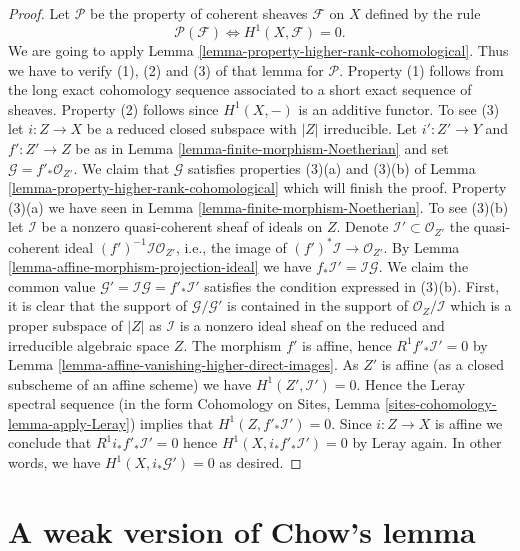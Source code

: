 \begin{proof}
\medskip\noindent
Let $\mathcal{P}$ be the property of coherent sheaves
$\mathcal{F}$ on $X$ defined by the rule
$$
\mathcal{P}(\mathcal{F}) \Leftrightarrow H^1(X, \mathcal{F}) = 0.
$$
We are going to apply Lemma \ref{lemma-property-higher-rank-cohomological}.
Thus we have to verify (1), (2) and (3) of that lemma for $\mathcal{P}$.
Property (1) follows from the long exact cohomology sequence associated
to a short exact sequence of sheaves. Property (2) follows since
$H^1(X, -)$ is an additive functor. To see (3) let $i : Z \to X$ be
a reduced closed subspace with $|Z|$ irreducible. Let $i' : Z' \to Y$
and $f' : Z' \to Z$ be as in Lemma \ref{lemma-finite-morphism-Noetherian}
and set $\mathcal{G} = f'_*\mathcal{O}_{Z'}$. We claim that
$\mathcal{G}$ satisfies properties (3)(a) and (3)(b) of
Lemma \ref{lemma-property-higher-rank-cohomological}
which will finish the proof. Property (3)(a) we have seen in
Lemma \ref{lemma-finite-morphism-Noetherian}. To see (3)(b) let
$\mathcal{I}$ be a nonzero quasi-coherent sheaf of ideals on $Z$.
Denote $\mathcal{I}' \subset \mathcal{O}_{Z'}$ the quasi-coherent
ideal $(f')^{-1}\mathcal{I} \mathcal{O}_{Z'}$, i.e., the
image of $(f')^*\mathcal{I} \to \mathcal{O}_{Z'}$.
By Lemma \ref{lemma-affine-morphism-projection-ideal} we have
$f_*\mathcal{I}' = \mathcal{I} \mathcal{G}$.
We claim the common value
$\mathcal{G}' = \mathcal{I} \mathcal{G} = f'_*\mathcal{I}'$
satisfies the condition expressed in (3)(b).
First, it is clear that the support of $\mathcal{G}/\mathcal{G}'$
is contained in the support of $\mathcal{O}_Z/\mathcal{I}$
which is a proper subspace of $|Z|$ as $\mathcal{I}$ is a
nonzero ideal sheaf on the reduced and irreducible algebraic space $Z$.
The morphism $f'$ is affine, hence $R^1f'_*\mathcal{I}' = 0$ by
Lemma \ref{lemma-affine-vanishing-higher-direct-images}.
As $Z'$ is affine (as a closed subscheme of an affine scheme)
we have $H^1(Z', \mathcal{I}') = 0$. Hence the Leray
spectral sequence (in the form
Cohomology on Sites, Lemma \ref{sites-cohomology-lemma-apply-Leray})
implies that $H^1(Z, f'_*\mathcal{I}') = 0$.
Since $i : Z \to X$ is affine we conclude that
$R^1i_*f'_*\mathcal{I}' = 0$ hence $H^1(X, i_*f'_*\mathcal{I}') = 0$
by Leray again. In other words, we have $H^1(X, i_*\mathcal{G}') = 0$
as desired.
\end{proof}








\section{A weak version of Chow's lemma}
\label{section-weak-chow}

